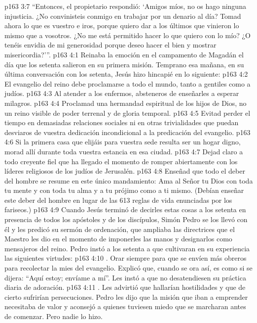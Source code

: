 \vs p163 3:7 “Entonces, el propietario respondió: ‘Amigos míos, no os hago ninguna injusticia. ¿No convinisteis conmigo en trabajar por un denario al día? Tomad ahora lo que es vuestro e iros, porque quiero dar a los últimos que vinieron lo mismo que a vosotros. ¿No me está permitido hacer lo que quiero con lo mío? ¿O tenéis envidia de mi generosidad porque deseo hacer el bien y mostrar misericordia?’”.
\vs p163 4:1 Reinaba la emoción en el campamento de Magadán el día que los setenta salieron en su primera misión. Temprano esa mañana, en su última conversación con los setenta, Jesús hizo hincapié en lo siguiente:
\vs p163 4:2 El evangelio del reino debe proclamarse a todo el mundo, tanto a gentiles como a judíos.
\vs p163 4:3 Al atender a los enfermos, absteneros de enseñarles a esperar milagros.
\vs p163 4:4 Proclamad una hermandad espiritual de los hijos de Dios, no un reino visible de poder terrenal y de gloria temporal.
\vs p163 4:5 Evitad perder el tiempo en demasiadas relaciones sociales ni en otras trivialidades que puedan desviaros de vuestra dedicación incondicional a la predicación del evangelio.
\vs p163 4:6 Si la primera casa que elijáis para vuestra sede resulta ser un hogar digno, morad allí durante toda vuestra estancia en esa ciudad.
\vs p163 4:7 Dejad claro a todo creyente fiel que ha llegado el momento de romper abiertamente con los líderes religiosos de los judíos de Jerusalén.
\vs p163 4:8 Enseñad que todo el deber del hombre se resume en este único mandamiento: Ama al Señor tu Dios con toda tu mente y con toda tu alma y a tu prójimo como a ti mismo. (Debían enseñar este deber del hombre en lugar de las 613 reglas de vida enunciadas por los fariseos.)
\vs p163 4:9 \pc Cuando Jesús terminó de decirles estas cosas a los setenta en presencia de todos los apóstoles y de los discípulos, Simón Pedro se los llevó con él y les predicó su sermón de ordenación, que ampliaba las directrices que el Maestro les dio en el momento de imponerles las manos y designarlos como mensajeros del reino. Pedro instó a los setenta a que cultivaran en su experiencia las siguientes virtudes:
\vs p163 4:10 . Orar siempre para que se envíen más obreros para recolectar la mies del evangelio. Explicó que, cuando se ora así, es como si se dijera: “Aquí estoy; envíame a mí”. Les instó a que no desatendiesen su práctica diaria de adoración.
\vs p163 4:11 . Les advirtió que hallarían hostilidades y que de cierto sufrirían persecuciones. Pedro les dijo que la misión que iban a emprender necesitaba de valor y aconsejó a quienes tuviesen miedo que se marcharan antes de comenzar. Pero nadie lo hizo.

